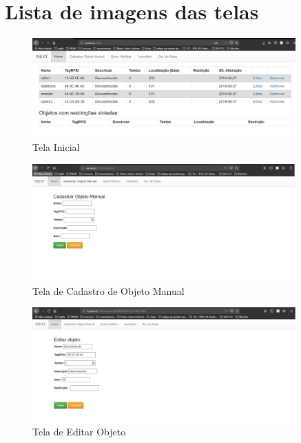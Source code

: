\label{chapter:anexo}
\section{Lista de imagens das telas}
\begin{figure}[H]
              \caption{\label{fig:tela_inical2}Tela Inicial }
              \centering
              \includegraphics[width=0.9\textwidth]{Figuras/execution1F.PNG}
    \end{figure}
    
    \begin{figure}[H]
              \caption{\label{fig:tela_cadastro_manual}Tela de Cadastro de Objeto Manual}
              \centering
              \includegraphics[width=0.9\textwidth]{Figuras/tela_cadastro_manual.png}
    \end{figure}
    
    \begin{figure}[H]
              \caption{\label{fig:tela_cadastro_manual}Tela de Editar Objeto}
              \centering
              \includegraphics[width=0.9\textwidth]{Figuras/tela_editar.png}
    \end{figure}
    
